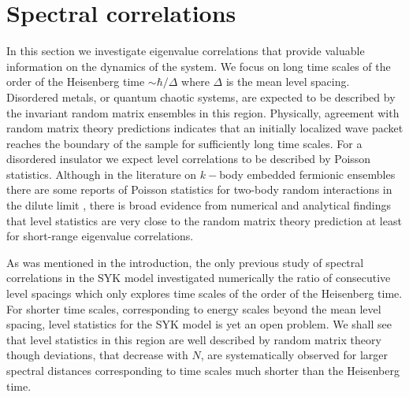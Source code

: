 \documentclass[aps,showpacs,floatfix,superscriptaddress,pre,11pt]{revtex4-1}
\begin{document}
 



 \section{Spectral correlations}
 In this section we investigate eigenvalue correlations that provide valuable information on the dynamics of the system. 
 We focus on long time scales of the order of the Heisenberg time $\sim \hbar/\Delta$ where $\Delta$ is the mean level spacing.
 Disordered metals, or quantum chaotic systems, are expected to be described by
 the invariant random matrix ensembles in this region. 
 Physically, agreement with random matrix theory predictions indicates that an
 initially localized wave packet reaches the boundary of the sample for sufficiently long time scales.
 For a disordered insulator we expect level correlations to be described by Poisson statistics.
 Although in the literature on $k-$body embedded fermionic ensembles there are some reports of
 Poisson statistics for two-body random interactions in the dilute limit \cite{benet2001}, there is broad evidence from numerical and analytical findings \cite{srednicki2002,verbaarschot1984,bohigas1971a} that level statistics are very close to the random matrix theory prediction at least for short-range eigenvalue correlations. 
 
 

 As was mentioned in the introduction, the only previous study of spectral correlations in the SYK 
 model \cite{you2016} investigated numerically the
ratio of consecutive level spacings
which only explores time scales of the order of the Heisenberg time.
For shorter time scales, corresponding to energy scales beyond
the mean level spacing, level statistics for the SYK model is yet an open problem. We shall see that level statistics in this region are well described by random matrix theory though deviations, that decrease with $N$, are systematically observed for larger spectral distances corresponding to time scales much shorter than the Heisenberg time. %
\end{document}
